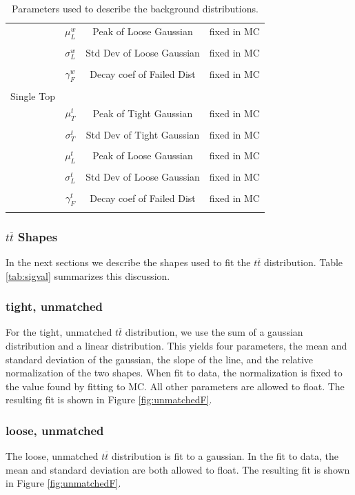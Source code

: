 \begin{}[h!]
\begin{table}
\begin{tabular}{l | c  c  c}
& $\mu^w_L$ & Peak of Loose Gaussian & fixed in MC\\
\\
& $\sigma^w_L$ & Std Dev of Loose Gaussian & fixed in MC\\
\\
& $\gamma^w_F$ & Decay coef of Failed Dist & fixed in MC\\
\\
\hline
Single Top & & & \\
& $\mu^t_T$ & Peak of Tight Gaussian & fixed in MC\\
\\
& $\sigma^t_T$ & Std Dev of Tight Gaussian & fixed in MC\\
\\
& $\mu^t_L$ & Peak of Loose Gaussian & fixed in MC\\
\\
& $\sigma^t_L$ & Std Dev of Loose Gaussian & fixed in MC\\
\\
& $\gamma^t_F$ & Decay coef of Failed Dist & fixed in MC\\
\\
\hline
\end{tabular}
\caption{Parameters used to describe the background distributions.} \label{tab:mcval}
\end{table}
\subsubsection{$t\overline{t}$ Shapes}
In the next sections we describe the shapes used to fit the $t\overline{t}$ distribution. Table \ref{tab:sigval} summarizes this discussion.
\subsubsection*{tight, unmatched}
For the tight, unmatched $t\overline{t}$ distribution, we use the sum of a gaussian distribution and a linear distribution. This yields four parameters, the mean and standard deviation of the gaussian, the slope of the line, and the relative normalization of the two shapes. When fit to data, the normalization is fixed to the value found by fitting to MC. All other parameters are allowed to float. The resulting fit is shown in Figure \ref{fig:unmatchedF}.
\subsubsection*{loose, unmatched}
The loose, unmatched $t\overline{t}$ distribution is fit to a gaussian. In the fit to data, the mean and standard deviation are both allowed to float. The resulting fit is shown in Figure \ref{fig:unmatchedF}.

\end{}
